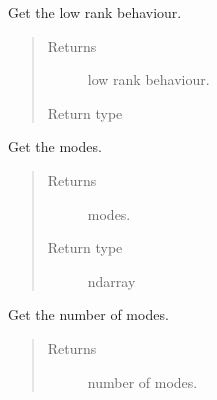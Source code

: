 \documentclass[letterpaper,10pt,english]{sphinxmanual}
\begin{document}
\begin{fulllineitems}
\begin{fulllineitems}
\label{\detokenize{index:pyparsvd.parsvd_base.ParSVD_Base.low_rank}}
\sphinxAtStartPar
Get the low rank behaviour.
\begin{quote}\begin{description}
\item[{Returns}] \leavevmode
\sphinxAtStartPar
low rank behaviour.

\item[{Return type}] \leavevmode
\sphinxAtStartPar
{}

\end{description}\end{quote}

\end{fulllineitems}


\begin{fulllineitems}
\label{\detokenize{index:pyparsvd.parsvd_base.ParSVD_Base.modes}}
\sphinxAtStartPar
Get the modes.
\begin{quote}\begin{description}
\item[{Returns}] \leavevmode
\sphinxAtStartPar
modes.

\item[{Return type}] \leavevmode
\sphinxAtStartPar
ndarray

\end{description}\end{quote}

\end{fulllineitems}


\begin{fulllineitems}
\label{\detokenize{index:pyparsvd.parsvd_base.ParSVD_Base.n_modes}}
\sphinxAtStartPar
Get the number of modes.
\begin{quote}\begin{description}
\item[{Returns}] \leavevmode
\sphinxAtStartPar
number of modes.


\end{description}
\end{quote}
\end{fulllineitems}
\end{fulllineitems}
\end{document}

